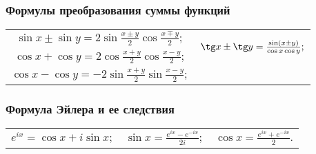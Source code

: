 \subsubsection{Формулы преобразования суммы функций}
\begin{tabular}{ c c}
$\sin x\pm \sin y =2 \sin \frac{x\pm y}{2} \cos \frac{x\mp y}{2};$
&
\multirow{2}{*}{$\tg x \pm \tg y = \frac{\sin (x \pm y)}{ \cos x \cos y};$}
\\
$\cos x + \cos y  = 2 \cos \frac{x + y}{2} \cos \frac{x - y}{2};$
&
\multirow{2}{*}{$\ctg x \pm \tg y = \frac{\sin (y \pm x)}{ \sin x \sin y}.$}
\\
$\cos x - \cos y  = -2 \sin \frac{x + y}{2} \sin\frac{x - y}{2};$
&
$ $
\end{tabular}
  
\subsubsection{Формула Эйлера и ее следствия}
\begin{tabular}{c c c}
$e^{ix} = \cos x + i \sin x;$
&
$\sin x = \frac{e^{ix}-e^{-ix}}{2i};$
&
$\cos x = \frac{e^{ix}+e^{-ix}}{2}.$
\end{tabular}

